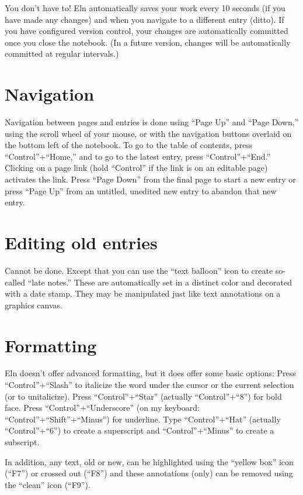 \documentclass[11pt]{report}
\begin{document}
You don't have to! Eln automatically saves your work every 10 seconds
(if you have made any changes) and when you navigate to a different
entry (ditto). If you have configured version control, your changes
are automatically committed once you close the notebook. (In a future
version, changes will be automatically committed at regular
intervals.)

\section{Navigation}

Navigation between pages and entries is done using ``Page Up'' and
``Page Down,'' using the scroll wheel of your mouse, or with the
navigation buttons overlaid on the bottom left of the notebook. To go
to the table of contents, press ``Control''+``Home,'' and to go to the
latest entry, press ``Control''+``End.'' Clicking on a page link (hold
``Control'' if the link is on an editable page) activates the
link. Press ``Page Down'' from the final page to start a new entry or
press ``Page Up'' from an untitled, unedited new entry to abandon that
new entry.

\section{Editing old entries}

Cannot be done. Except that you can use the ``text balloon'' icon to
create so-called ``late notes.'' These are automatically set in a
distinct color and decorated with a date stamp. They
may be manipulated just like text annotations on a graphics canvas.

\section{Formatting}

Eln doesn't offer advanced formatting, but it does offer some basic
options: Press ``Control''+``Slash'' to italicize the word under the
cursor or the current selection (or to unitalicize). Press
``Control''+``Star'' (actually ``Control''+``8'') for bold face. Press
``Control''+``Underscore'' (on my keyboard: ``Control''+``Shift''+``Minus'') for
underline. Type ``Control''+``Hat'' (actually ``Control''+``6'') to create a superscript
and ``Control''+``Minus'' to create a subscript.

In addition, any text, old or new, can be highlighted using the
``yellow box'' icon (``F7'') or crossed out (``F8'') and these
annotations (only) can be removed using the ``clean'' icon (``F9'').
\end{document}
